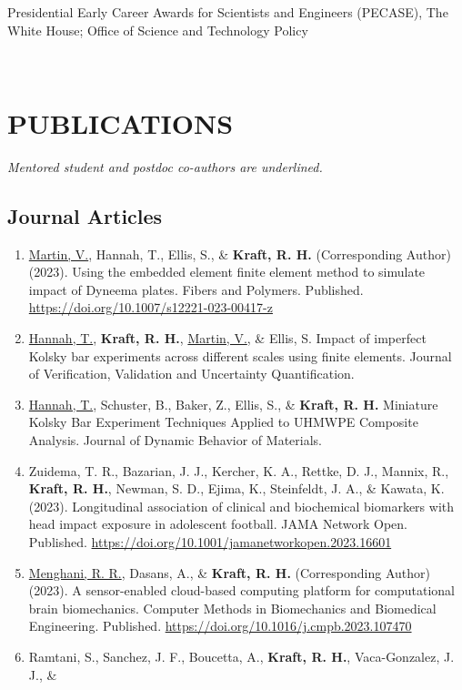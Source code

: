\documentclass[a4paper,10pt]{article}
\begin{document}
        \noindent \parbox[t]{0.8\linewidth}{\raggedright Presidential Early Career Awards for Scientists and Engineers (PECASE), The White House; Office of Science and Technology Policy} \hfill \parbox[t]{0.2\linewidth}{} \\
        

    \section*{PUBLICATIONS}
    \textit{Mentored student and postdoc co-authors are underlined.}
    \subsection*{Journal Articles}
    \begin{enumerate}
     \item	\underline{Martin, V.}, Hannah, T., Ellis, S., \&
 \textbf{\textbf{Kraft,} R. H.} (Corresponding Author) (2023). Using the embedded element finite element method to simulate impact of Dyneema plates. Fibers and Polymers. Published. \url{https://doi.org/10.1007/s12221-023-00417-z}
 \item	\underline{Hannah, T.}, \textbf{\textbf{Kraft,} R. H.}, \underline{Martin, V.}, \&
 Ellis, S. Impact of imperfect Kolsky bar experiments across different scales using finite elements. Journal of Verification, Validation and Uncertainty Quantification.
 \item	\underline{Hannah, T.}, Schuster, B., Baker, Z., Ellis, S., \&
 \textbf{\textbf{Kraft,} R. H.} Miniature Kolsky Bar Experiment Techniques Applied to UHMWPE Composite Analysis. Journal of Dynamic Behavior of Materials.
 \item	Zuidema, T. R., Bazarian, J. J., Kercher, K. A., Rettke, D. J., Mannix, R., \textbf{\textbf{Kraft,} R. H.}, Newman, S. D., Ejima, K., Steinfeldt, J. A., \&
 Kawata, K. (2023). Longitudinal association of clinical and biochemical biomarkers with head impact exposure in adolescent football. JAMA Network Open. Published. \url{https://doi.org/10.1001/jamanetworkopen.2023.16601}
 \item	\underline{Menghani, R. R.}, Dasans, A., \&
 \textbf{\textbf{Kraft,} R. H.} (Corresponding Author) (2023). A sensor-enabled cloud-based computing platform for computational brain biomechanics. Computer Methods in Biomechanics and Biomedical Engineering. Published. \url{https://doi.org/10.1016/j.cmpb.2023.107470}
 \item	Ramtani, S., Sanchez, J. F., Boucetta, A., \textbf{\textbf{Kraft,} R. H.}, Vaca-Gonzalez, J. J., \&

\end{enumerate}
\end{document}
